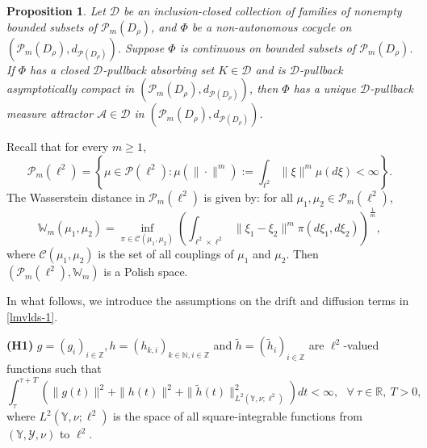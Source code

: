 \documentclass[11pt]{article}
\numberwithin{equation}{section}
\theoremstyle{plain}
\newtheorem{prop}{Proposition}[section]
\begin{document}
\begin{prop} \label{mae}
    Let $\mathcal{D}$ be an inclusion-closed collection of families of nonempty bounded subsets of $\mathcal{P}_m(D_{\rho})$,
    and $ \Phi $ be a non-autonomous cocycle on
    $\left( \mathcal{P}_m(D_{\rho}), d_{\mathcal{P}(D_{\rho})} \right)$.
    Suppose $\Phi$ is continuous on bounded subsets of $\mathcal{P}_m(D_{\rho})$.
    If $\Phi$ has a closed $\mathcal{D}$-pullback absorbing set $K \in \mathcal{D}$
    and is $\mathcal{D}$-pullback asymptotically compact in $\left( \mathcal{P}_m(D_{\rho}), d_{\mathcal{P}(D_{\rho})} \right)$,
    then $\Phi$ has a unique $\mathcal{D}$-pullback measure attractor $\mathcal{A} \in \mathcal{D}$
    in $\left( \mathcal{P}_m(D_{\rho}), d_{\mathcal{P}(D_{\rho})} \right)$.
\end{prop}
\fi


Recall that
 for every $ m \ge 1 $,  
 $$ \mathcal{P}_m(\ell^2) = \left\{ \mu \in \mathcal{P}(\ell^2): \mu(\|\cdot\|^m) := \int_{\ell^2} \|\xi\|^m \mu(d\xi) < \infty \right\}.$$
 The Wasserstein distance 
 in   $\mathcal{P}_m(\ell^2)$ is given by:
 for all  $\mu_1, \mu_2 \in \mathcal{P}_m(\ell^2)$,  
 $$ \mathbb{W}_m(\mu_1,\mu_2)
    = \inf_{\pi \in \mathcal{C}(\mu_1,\mu_2)}
            \left( \int_{\ell^2 \times \ell^2}
                       \|\xi_1 - \xi_2\|^m \pi(d\xi_1, d\xi_2)
            \right)^{\frac{1}{m}},
 $$
 where $\mathcal{C}(\mu_1,\mu_2)$ is the set of all couplings of $\mu_1$ and $\mu_2$.
 Then $\left( \mathcal{P}_m(\ell^2), \mathbb{W}_m \right)$ is a Polish space.


 In what follows, we
 introduce the  assumptions on
 the  drift and diffusion terms in \eqref{lmvlds-1}.

\noindent
{\bf(H1)}
 $g =(g_i)_{i \in \mathbb{Z}},
  h = (h_{k,i})_{k \in \mathbb{N}, i \in \mathbb{Z}}$
 and $\widetilde{h} = (\widetilde{h}_{i})_{ i \in \mathbb{Z}}$
 are $\ell^2$-valued functions  such that
 $$ \int_{\tau}^{\tau + T}
       \left(\| g(t) \|^2
              + \| h(t) \|^2
              + \| \widetilde{h}(t) \|^2_{L^2(\mathbb{Y}, \nu; \ell^2)}
       \right) dt
    < \infty, \ \ \  \forall\  \tau \in \mathbb{R},~ T > 0,
 $$
  where
$
  L^2(\mathbb{Y}, \nu; \ell^2)$
  is the space of all 
  square-integrable
  functions from $(\mathbb{Y},
  \mathcal{Y}, \nu)$
  to $\ell^2$.
  
\end{document}
